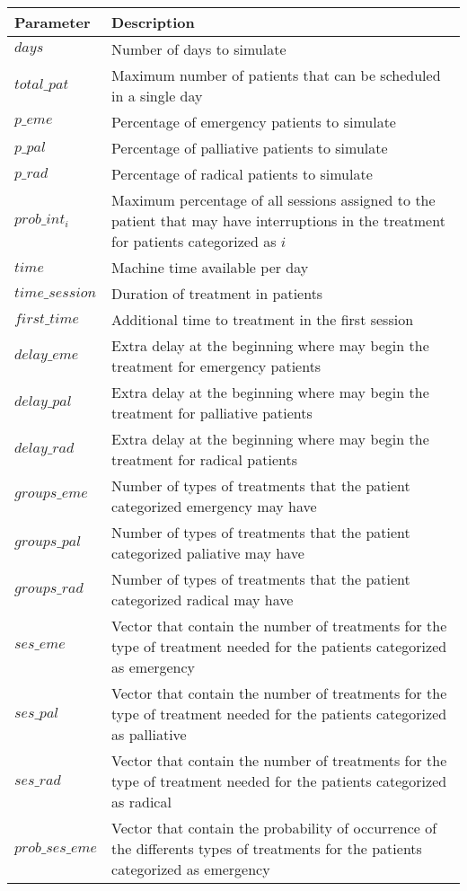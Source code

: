 \begin{tabular}{ll}
\hline
 Parameter & Description\\
 \hline
 $days$ & Number of days to simulate\\
 $total\_pat$ & Maximum number of patients that can be scheduled in a single day\\
 $p\_eme$ & Percentage of emergency patients to simulate\\
 $p\_pal$ & Percentage of palliative patients to simulate\\
 $p\_rad$ & Percentage of radical patients to simulate\\
 $prob\_int_i$ & Maximum percentage of all sessions assigned to the patient that may have interruptions in the treatment for patients categorized as $i$\\
 $time$ & Machine time available per day\\
 $time\_session$ & Duration of treatment in patients\\
 $first\_time$ & Additional time to treatment in the first session\\
 $delay\_eme$ & Extra delay at the beginning where may begin the treatment for emergency patients\\
 $delay\_pal$ & Extra delay at the beginning where may begin the treatment for palliative patients\\
 $delay\_rad$ & Extra delay at the beginning where may begin the treatment for radical patients\\
 $groups\_eme$ & Number of types of treatments that the patient categorized emergency may have\\
 $groups\_pal$ & Number of types of treatments that the patient categorized paliative may have\\
 $groups\_rad$ & Number of types of treatments that the patient categorized radical may have\\
 $ses\_eme$ & Vector that contain the number of treatments for the type of treatment needed for the patients categorized as emergency\\
 $ses\_pal$ & Vector that contain the number of treatments for the type of treatment needed for the patients categorized as palliative\\
 $ses\_rad$ & Vector that contain the number of treatments for the type of treatment needed for the patients categorized as radical\\
 $prob\_ses\_eme$ & Vector that contain the probability of occurrence of the differents types of treatments for the patients categorized as emergency\\

\end{tabular}

